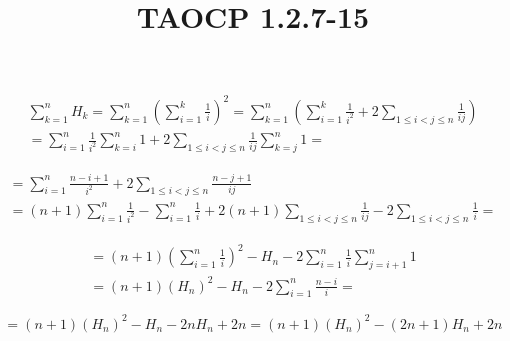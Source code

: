 \documentclass{article}
\title{TAOCP 1.2.7\mbox{-}15}
\begin{document}
\maketitle

\begin{multline*}
\sum_{k=1}^{n} H_{k} = \sum_{k=1}^{n} {(\sum_{i=1}^{k} \frac{1}{i})}^{2} = \sum_{k=1}^{n} (\sum_{i=1}^{k} \frac{1}{i^{2}} + 2 \sum_{1 \leq i < j \leq n } \frac{1}{ij}) \\
= \sum_{i=1}^{n} \frac{1}{i^{2}} \sum_{k=i}^{n} 1 + 2 \sum_{1 \leq i < j \leq n} \frac{1}{ij} \sum_{k=j}^{n} 1 =
\end{multline*}

\begin{multline*}
= \sum_{i=1}^{n} \frac{n-i+1}{i^{2}} + 2 \sum_{1 \leq i < j \leq n} \frac{n-j+1}{ij} \\
= (n+1) \sum_{i=1}^{n} \frac{1}{i^{2}} - \sum_{i=1}^{n}\frac{1}{i} + 2(n+1) \sum_{1 \leq i < j \leq n} \frac{1}{ij} - 2 \sum_{1 \leq i < j \leq n} \frac{1}{i} =
\end{multline*}

\begin{multline*}
= (n+1) {(\sum_{i=1}^{n} \frac{1}{i})}^{2} - H_{n} - 2 \sum_{i=1}^{n} \frac{1}{i} \sum_{j=i+1}^{n} 1 \\
= (n+1) {(H_{n})}^{2} - H_{n} - 2 \sum_{i=1}^{n} \frac{n-i}{i} =
\end{multline*}

\[ = (n+1) {(H_{n})}^{2} - H_{n} - 2n H_{n} + 2n = (n+1) {(H_{n})}^{2} - (2n+1) H_{n} + 2n \]
\end{document}
